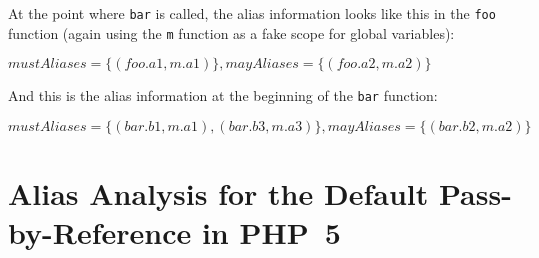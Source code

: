At the point where \texttt{bar} is called, the alias information looks like this in the \texttt{foo} function (again using the \texttt{m} function as a fake scope for global variables):

$mustAliases = \{(foo.a1, m.a1)\}, mayAliases = \{(foo.a2, m.a2)\}$

And this is the alias information at the beginning of the \texttt{bar} function:

$mustAliases = \{(bar.b1, m.a1), (bar.b3, m.a3)\}, mayAliases = \{(bar.b2, m.a2)\}$





\section{Alias Analysis for the Default Pass-by-Reference in PHP~5}
